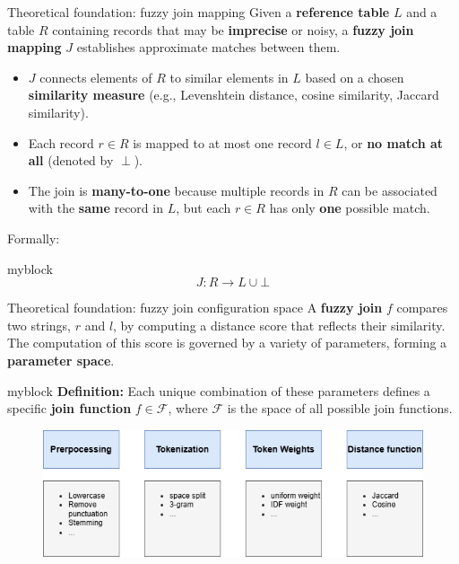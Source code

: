 \documentclass[8pt]{beamer} %
\begin{document}

\begin{frame}{Theoretical foundation: fuzzy join mapping}
	Given a \textbf{reference table} $L$ and a table $R$ containing records that may be \textbf{imprecise} or noisy, a \textbf{fuzzy join mapping} $J$ establishes approximate matches between them.
	
	\begin{itemize}
	\item $J$ connects elements of $R$ to similar elements in $L$ based on a chosen \textbf{similarity measure} (e.g., Levenshtein distance, cosine similarity, Jaccard similarity).
	\item Each record $r \in R$ is mapped to at most one record $l \in L$, or \textbf{no match at all} (denoted by $\perp$).
	\item The join is \textbf{many-to-one} because multiple records in $R$ can be associated with the \textbf{same} record in $L$, but each $r \in R$ has only \textbf{one} possible match.
	\end{itemize}
	
	Formally:
	\begin{beamercolorbox}[rounded=true, shadow=true, leftskip=1em, rightskip=1em]{myblock}
		$$
		J: R \rightarrow L \cup \bot
		$$
	\end{beamercolorbox}
\end{frame}


\begin{frame}{Theoretical foundation: fuzzy join configuration space}
	A \textbf{fuzzy join} $f$ compares two strings, $r$ and $l$, by computing a distance score that reflects their similarity. The computation of this score is governed by a variety of parameters, forming a \textbf{parameter space}. 
	
	\begin{beamercolorbox}[rounded=true, shadow=true, leftskip=1em, rightskip=1em]{myblock}
		\textbf{Definition:} Each unique combination of these parameters defines a specific \textbf{join function} $f \in \mathcal{F}$, where $\mathcal{F}$ is the space of all possible join functions.
	\end{beamercolorbox}
	
	\begin{figure}
		\centering
				\includegraphics[width=0.7\linewidth]{img/join_configuration.png}
	\end{figure}
\end{frame}
\end{document}
